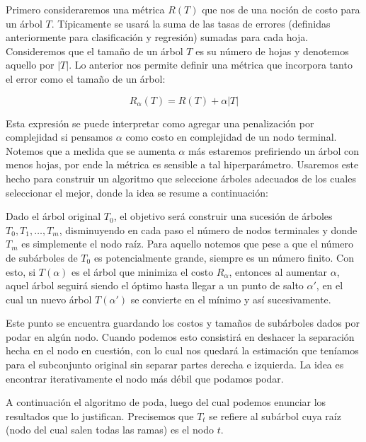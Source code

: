 Primero consideraremos una métrica $R(T)$ que nos de una noción de costo para un árbol $T$. Típicamente se usará la suma de las tasas de errores (definidas anteriormente para clasificación y regresión) sumadas para cada hoja. Consideremos que el tamaño de un árbol $T$ es su número de hojas y denotemos aquello por $|T|$. Lo anterior nos permite definir una métrica que incorpora tanto el error como el tamaño de un árbol:

\begin{equation}
    R_\alpha (T) = R(T) + \alpha |T|
\end{equation}

Esta expresión se puede interpretar como agregar una penalización por complejidad si pensamos $\alpha$ como costo en complejidad de un nodo terminal. Notemos que a medida que se aumenta $\alpha$ más estaremos prefiriendo un árbol con menos hojas, por ende la métrica es sensible a tal hiperparámetro. Usaremos este hecho para construir un algoritmo que seleccione árboles adecuados de los cuales seleccionar el mejor, donde la idea se resume a continuación:

Dado el árbol original $T_0$, el objetivo será construir una sucesión de árboles $T_0, T_1, \dots, T_m$, disminuyendo en cada paso el número de nodos terminales y donde $T_m$ es simplemente el nodo raíz. Para aquello notemos que pese a que el número de subárboles de $T_0$ es potencialmente grande, siempre es un número finito. Con esto, si $T(\alpha)$ es el árbol que minimiza el costo $R_\alpha$, entonces al aumentar $\alpha$, aquel árbol seguirá siendo el óptimo hasta llegar a un punto de salto $\alpha'$, en el cual un nuevo árbol $T(\alpha')$ se convierte en el mínimo y así sucesivamente.

Este punto se encuentra guardando los costos y tamaños de subárboles dados por podar en algún nodo. Cuando podemos esto consistirá en deshacer la separación hecha en el nodo en cuestión, con lo cual nos quedará la estimación que teníamos para el subconjunto original sin separar partes derecha e izquierda. La idea es encontrar iterativamente el nodo más débil que podamos podar.

A continuación el algoritmo de poda, luego del cual podemos enunciar los resultados que lo justifican. Precisemos que $T_t$ se refiere al subárbol cuya raíz (nodo del cual salen todas las ramas) es el nodo $t$.

